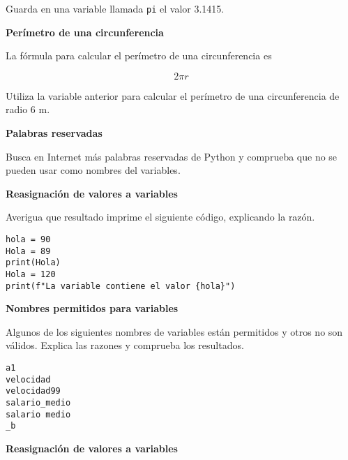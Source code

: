 \documentclass[a4paper, 11pt]{scrartcl}
\newenvironment{code}{\begin{tcolorbox}[colback=red!2!white]}{\end{tcolorbox}}
\begin{document}
Guarda en una variable llamada \verb|pi| el valor 3.1415.





\noindent\textbf{\sffamily Perímetro de una circunferencia}

La fórmula para calcular el perímetro de una circunferencia es 

$$
2\pi r
$$

Utiliza la variable anterior para calcular el perímetro de una circunferencia de radio 6 m.





\noindent\textbf{\sffamily Palabras reservadas}

Busca en Internet más palabras reservadas de Python y comprueba que no se pueden usar como nombres del variables.





\noindent\textbf{\sffamily Reasignación de valores a variables}

Averigua que resultado imprime el siguiente código, explicando la razón.
\smallskip

\begin{code}

\begin{verbatim}
hola = 90
Hola = 89
print(Hola)
Hola = 120
print(f"La variable contiene el valor {hola}")
\end{verbatim}

\end{code}





\noindent\textbf{\sffamily Nombres permitidos para variables}

Algunos de los siguientes nombres de variables están permitidos y otros no son válidos. Explica las razones y comprueba los resultados.

\smallskip

\begin{code}

\begin{verbatim}
a1
velocidad
velocidad99
salario_medio
salario medio
_b
\end{verbatim}

\end{code}





\noindent\textbf{\sffamily Reasignación de valores a variables}
\end{document}
